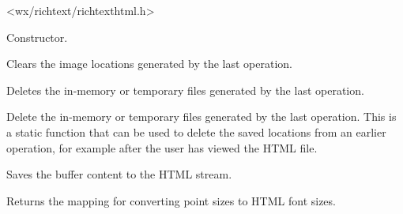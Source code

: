 


<wx/richtext/richtexthtml.h>



\label{wxrichtexthtmlhandlerwxrichtexthtmlhandler}


Constructor.

\label{wxrichtexthtmlhandlercleartemporaryimagelocations}


Clears the image locations generated by the last operation.

\label{wxrichtexthtmlhandlerdeletetemporaryimages}


Deletes the in-memory or temporary files generated by the last operation.


Delete the in-memory or temporary files generated by the last operation. This is a static
function that can be used to delete the saved locations from an earlier operation,
for example after the user has viewed the HTML file.

\label{wxrichtexthtmlhandlerdosavefile}


Saves the buffer content to the HTML stream.

\label{wxrichtexthtmlhandlergetfontsizemapping}


Returns the mapping for converting point sizes to HTML font sizes.

